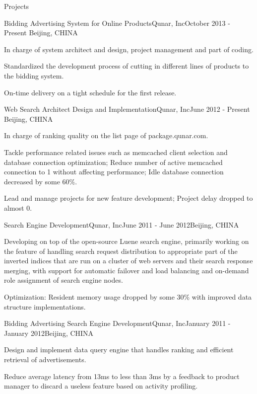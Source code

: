 \documentclass{resume} %
\begin{document}
\begin{rSection}{Projects}

\begin{rSubsection}{Bidding Advertising System for Online Products}{Qunar, Inc}{October 2013 - Present}
{Beijing, CHINA}
\item In charge of system architect and design, project management and part of coding.
\item Standardized the development process of cutting in different lines of products to the bidding system.
\item On-time delivery on a tight schedule for the first release.
\end{rSubsection}

\begin{rSubsection}{Web Search Architect Design and Implementation}{Qunar, Inc}{June 2012 - Present}
{Beijing, CHINA}
\item In charge of ranking quality on the list page of package.qunar.com.
\item Tackle performance related issues such as memcached client selection and database connection optimization; Reduce number of active memcached connection to 1 without affecting performance; Idle database connection decreased by some 60\%.
\item Lead and manage projects for new feature development; Project delay dropped to almost 0.

\end{rSubsection}

\begin{rSubsection}{Search Engine Development}{Qunar, Inc}{June 2011 -
    June 2012}{Beijing, CHINA}
\item Developing on top of the open-source Luene search engine, primarily working on the feature of handling search
request distribution to appropriate part of the inverted indices that are run on a cluster of web servers and their
search response merging, with support for automatic failover and load balancing and on-demand role
assignment of search engine nodes.
\item Optimization: Resident memory usage dropped by some 30\% with improved data structure implementations.
\end{rSubsection}

\begin{rSubsection}{Bidding Advertising Search Engine
    Development}{Qunar, Inc}{January 2011 -
    January 2012}{Beijing, CHINA}
\item Design and implement data query engine that handles ranking and efficient retrieval of advertisements.
\item Reduce average latency from 13ms to less than 3ms by a feedback to product manager to discard a useless 
feature based on activity profiling. 
\end{rSubsection}

\end{rSection}
\end{document}

